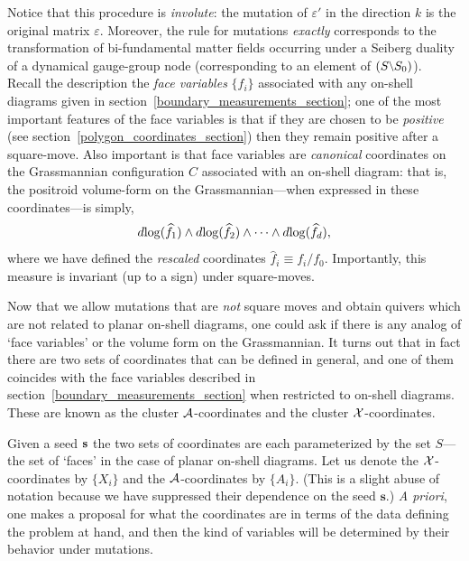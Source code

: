 \documentclass[12pt,hyperref,compress]{JHEP3}
\renewcommand{\hat}{\widehat}
\newcommand{\eq}[1]{\begin{equation}#1\end{equation}}
\begin{document}
Notice that this procedure is {\it involute}: the mutation of $\varepsilon'$ in the direction $k$ is the original matrix $\varepsilon$. Moreover, the rule for mutations {\it exactly} corresponds to the transformation of bi-fundamental matter fields occurring under a Seiberg duality of a dynamical gauge-group node (corresponding to an element of $(S\raisebox{1pt}{\text{{\footnotesize$\backslash$}}} S_0)$).\\[-7pt]

 Recall the description the {\it face variables} $\{f_i\}$ associated with any on-shell diagrams given in \mbox{section \ref{boundary_measurements_section}}; one of the most important features of the face variables is that if they are chosen to be {\it positive} (see \mbox{section \ref{polygon_coordinates_section}}) then they remain positive after a square-move. Also important is that face variables are {\it canonical} coordinates on the Grassmannian configuration $C$ associated with an on-shell diagram: that is, the positroid volume-form on the Grassmannian---when expressed in these coordinates---is simply,
\vspace{-.2cm}\eq{d\!\log(\hat{f}_1)\wedge d\!\log(\hat{f}_2)\wedge\cdots\wedge d\!\log(\hat{f}_d),\vspace{-.2cm}}
where we have defined the {\it rescaled} coordinates $\hat{f}_i\!\equiv\! f_i/f_0$. Importantly, this measure is invariant (up to a sign) under square-moves.

Now that we allow mutations that are {\it not} square moves and obtain quivers which are not related to planar on-shell diagrams, one could ask if there is any analog of `face variables' or the volume form on the Grassmannian. It turns out that in fact there are two sets of coordinates that can be defined in general, and one of them coincides with the face variables described in \mbox{section \ref{boundary_measurements_section}} when restricted to on-shell diagrams. These are known as the cluster ${\cal A}$-coordinates and the cluster ${\cal X}$-coordinates.

Given a seed ${\bf s}$ the two sets of coordinates are each parameterized by the set $S$---the set of `faces' in the case of planar on-shell diagrams. Let us denote the ${\cal X}$-coordinates by $\{X_i\}$ and the ${\cal A}$-coordinates by $\{A_i\}$. (This is a slight abuse of notation because we have suppressed their dependence on the seed $\mathbf{s}$.) {\it A priori}, one makes a proposal for what the coordinates are in terms of the data defining the problem at hand, and then the kind of variables will be determined by their behavior under mutations.
\end{document}
